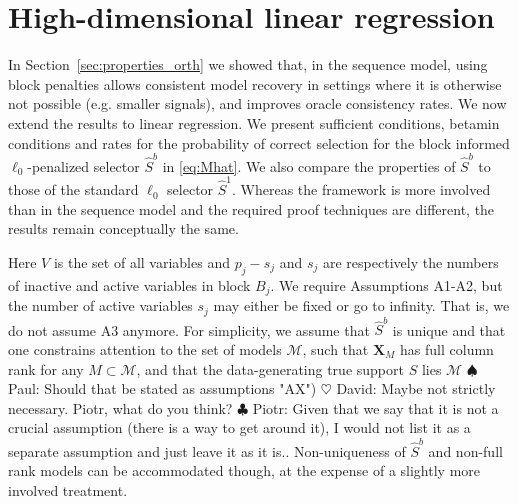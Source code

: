 \documentclass[aos]{imsart}
\theoremstyle{plain}
\newcommand{\david}[1]{{\small{\color{blue} \sf $\heartsuit$ David: #1}}}
\newcommand{\piotr}[1]{{\small{\color{red} \sf $\clubsuit$ Piotr: #1}}}
\newcommand{\paul}[1]{{\small{\color{green} \sf $\spadesuit$ Paul: #1}}}
\newcommand{\bs}{\boldsymbol}
\begin{document}
\section{High-dimensional linear regression}
\label{sec:properties_legression}

In Section~\ref{sec:properties_orth} we showed that, in the sequence model, using block penalties allows consistent model recovery in settings where it is otherwise not possible (e.g. smaller signals), and improves oracle consistency rates. We now extend the results to linear regression. 
We present sufficient conditions, %
betamin conditions and rates for the probability of correct selection for the block informed $\ell_0$-penalized selector $\hat S^b$ in \eqref{eq:Mhat}. We also compare the properties of $\hat S^b$ to those of the standard $\ell_0$ selector $\hat S^1$. %
Whereas the framework is more involved than in the sequence model and the required proof techniques are different, the results
remain conceptually the same. 

Here %
$V$ is the set of all variables and %
$p_j-s_j$ and $s_j$ are respectively the numbers of inactive and active variables in block $B_j$. We require Assumptions A1-A2, but the number of active variables $s_j$ may either be fixed or go to infinity. %
That is, we do not assume A3 anymore. For simplicity, we assume that $\hat{S}^b$ is unique and that one constrains attention to the set of models $\mathcal{M}$,
such that %
$\bs X_M$ has full column rank for any $M \subset \mathcal{M}$, and that the data-generating true support $S$ lies $\mathcal{M}$ \paul{Should that be stated as assumptions "AX")} \david{Maybe not strictly necessary. Piotr, what do you think?}\piotr{Given that we say that it is not a crucial assumption (there is a way to get around it), I would not list it as a separate assumption and just leave it as it is.}. Non-uniqueness of $\hat{S}^b$ and non-full rank models can be accommodated though, at the expense of a slightly more involved treatment.
\end{document}
